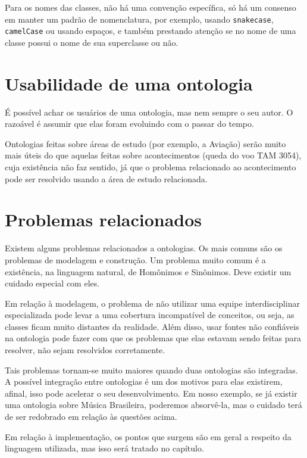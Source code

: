Para os nomes das classes, não há uma convenção específica, só há um consenso em manter um padrão de nomenclatura, por exemplo, usando \texttt{snake\textunderscore case}, \texttt{camelCase} ou usando espaços, e também prestando atenção se no nome de uma classe possui o nome de sua superclasse ou não.

\section{Usabilidade de uma ontologia}

É possível achar os usuários de uma ontologia, mas nem sempre o seu autor. O razoável é assumir que elas foram evoluindo com o passar do tempo. 

Ontologias feitas sobre áreas de estudo (por exemplo, a Aviação) serão muito mais úteis do que aquelas feitas sobre acontecimentos (queda do voo TAM 3054), cuja existência não faz sentido, já que o problema relacionado ao acontecimento pode ser resolvido usando a área de estudo relacionada.

\section{Problemas relacionados}

	Existem alguns problemas relacionados a ontologias. Os mais comuns são os problemas de modelagem e construção. Um problema muito comum é a existência, na linguagem natural, de Homônimos e Sinônimos. Deve existir um cuidado especial com eles.
	
	Em relação à modelagem, o problema de não utilizar uma equipe interdisciplinar especializada pode levar a uma cobertura incompatível de conceitos, ou seja, as classes ficam muito distantes da realidade. Além disso, usar fontes não confiáveis na ontologia pode fazer com que os problemas que elas estavam sendo feitas para resolver, não sejam resolvidos corretamente.
	
	Tais problemas tornam-se muito maiores quando duas ontologias são integradas. A possível integração entre ontologias é um dos motivos para elas existirem, afinal, isso pode acelerar o seu desenvolvimento. Em nosso exemplo, se já existir uma ontologia sobre Música Brasileira, poderemos absorvê-la, mas o cuidado terá de ser redobrado em relação às questões acima. 
	
	Em relação à implementação, os pontos que surgem são em geral a respeito da linguagem utilizada, mas isso será tratado no capítulo.
	
